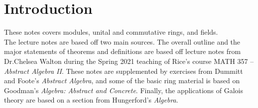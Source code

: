 \documentclass{memoir}
\begin{document}


\chapter{Introduction}
\label{cha:introduction}

These notes covers modules, unital and commutative rings, and fields.\\

The lecture notes are based off two main sources. The overall outline and the major statements of theorems and definitions are based off lecture notes from Dr.\@ Chelsea Walton during the Spring 2021 teaching of Rice's course MATH 357 -- \textit{Abstract Algebra II}. These notes are supplemented by exercises from Dummitt and Foote's \textit{Abstract Algebra}, and some of the basic ring material is based on Goodman's \textit{Algebra: Abstract and Concrete}. Finally, the applications of Galois theory are based on a section from Hungerford's \textit{Algebra}.
\end{document}
